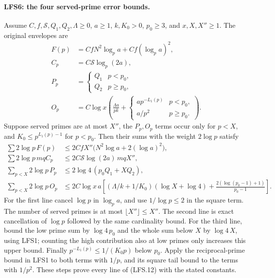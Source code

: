 \paragraph{LFS6: the four served-prime error bounds.}
\label{claim:LFS6}
Assume $C,f,\mathcal S,Q_1,Q_2,\Lambda\ge0$, $a\ge1$,
$k,K_0>0$, $p_0\ge3$, and $x,X,X''\ge1$.
The original envelopes are
\begin{align*}
 F(p)&=CfN^2\log_p a+Cf(\log_pa)^2,\\
 C_p&=C\mathcal S\log_p(2a),\\
 P_p&=\begin{cases}Q_1&p<p_0,\\Q_2&p\ge p_0,\end{cases}\\
 O_p&=C\log x\left(\frac{\Lambda a}{pk}
  +\begin{cases}ap^{-L_1(p)}&p<p_0,\\a/p^2&p\ge p_0.\end{cases}\right).
\end{align*}
Suppose served primes are at most $X''$, the $P_p,O_p$ terms
occur only for $p<X$, and $K_0\le p^{L_1(p)-1}$ for $p<p_0$.
Then their sums with the weight $2\log p$ satisfy
\begin{align*}
 \sum 2\log p\,F(p)
 &\le2CfX''\bigl(N^2\log a+2(\log a)^2\bigr),\\
 \sum 2\log p\,mqC_p
 &\le2C\mathcal S\log(2a)\,mqX'',\\
 \sum_{p<X}2\log p\,P_p
 &\le2\log4\,(p_0Q_1+XQ_2),\\
 \sum_{p<X}2\log p\,O_p
 &\le2C\log x\,a\left[
    (\Lambda/k+1/K_0)(\log X+\log4)
    +\frac{2(\log(p_0-1)+1)}{p_0-1}\right].             \tag{LFS.12}
\end{align*}
For the first line cancel $\log p$ in $\log_pa$, and use
$1/\log p\le2$ in the square term.  The number of served
primes is at most $\lfloor X''\rfloor\le X''$.
The second line is exact cancellation of $\log p$ followed by
the same cardinality bound.  For the third line, bound the low
prime sum by $\log4\,p_0$ and the whole sum below $X$ by
$\log4\,X$, using LFS1; counting the high contribution also
at low primes only increases this upper bound.
Finally $p^{-L_1(p)}\le1/(K_0p)$ below $p_0$.
Apply the reciprocal-prime bound in LFS1 to both terms with
$1/p$, and its square tail bound to the terms with $1/p^2$.
These steps prove every line of (LFS.12) with the stated constants.

